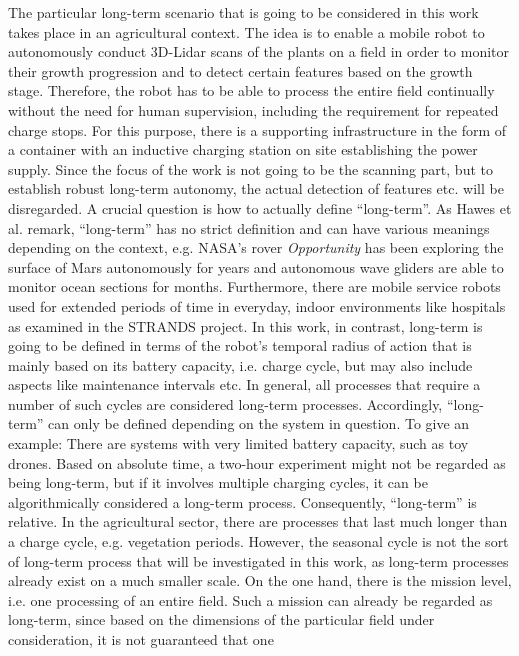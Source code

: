 \documentclass[english, master, expose, utf8]{base/thesis_KBS}
\begin{document}
The particular long-term scenario that is going to be considered in this work takes place in an agricultural context.
The idea is to enable a mobile robot to autonomously conduct 3D-Lidar scans of the plants on a field in order to monitor their growth progression and 
to detect certain features based on the growth stage. Therefore, the robot has to be able to process the entire field continually without the need for human supervision,
including the requirement for repeated charge stops. For this purpose, there is a supporting infrastructure in the form of a container with an inductive charging station on site
establishing the power supply. Since the focus of the work is not going to be the scanning part, but to establish robust long-term autonomy, the actual detection of features 
etc. will be disregarded.
A crucial question is how to actually define ``long-term''. As Hawes et al. remark, ``long-term'' has no strict definition and can have various meanings depending
on the context, e.g. NASA's rover \textit{Opportunity} has been exploring the surface of Mars autonomously for years and autonomous wave gliders are able to monitor
ocean sections for months. Furthermore, there are mobile service robots used for extended periods of time in everyday, indoor environments like hospitals 
as examined in the STRANDS project. \cite{Hawes:2017}
In this work, in contrast, long-term is going to be defined in terms of the robot's temporal radius of action that is mainly based on its battery capacity, i.e. charge cycle,
but may also include aspects like maintenance intervals etc. In general, all processes that require a number of such cycles are considered long-term processes.
Accordingly, ``long-term'' can only be defined depending on the system in question. To give an example: There are systems with very limited battery capacity, 
such as toy drones. Based on absolute time, a two-hour experiment might not be regarded as being long-term, but if it involves multiple charging cycles, it can be 
algorithmically considered a long-term process. Consequently, ``long-term'' is relative.\newline
In the agricultural sector, there are processes that last much longer than a charge cycle, e.g. vegetation periods.
However, the seasonal cycle is not the sort of long-term process that will be investigated in this work, as long-term processes already exist on a much smaller scale.
On the one hand, there is the mission level, i.e. one processing of an entire field. 
Such a mission can already be regarded as long-term, since based on the dimensions of the particular field under consideration, it is not guaranteed that one
\end{document}
